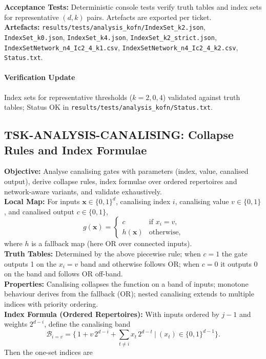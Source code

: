 \documentclass{article}
\begin{document}
\textbf{Acceptance Tests:} Deterministic console tests verify truth tables and index sets for representative \((d,k)\) pairs. Artefacts are exported per ticket.\\
\textbf{Artefacts:} \texttt{results/tests/analysis\_kofn/IndexSet\_k2.json}, \texttt{IndexSet\_k0.json}, \texttt{IndexSet\_k4.json}, \texttt{IndexSet\_k2\_strict.json}, \texttt{IndexSetNetwork\_n4\_Ic2\_4\_k1.csv}, \texttt{IndexSetNetwork\_n4\_Ic2\_4\_k2.csv}, \texttt{Status.txt}.
\paragraph{Verification Update} Index sets for representative thresholds (\(k=2,0,4\)) validated against truth tables; Status OK in \texttt{results/tests/analysis\_kofn/Status.txt}.
\subsection{TSK-ANALYSIS-CANALISING: Collapse Rules and Index Formulae}
\textbf{Objective:} Analyse canalising gates with parameters (index, value, canalised output), derive collapse rules, index formulae over ordered repertoires and network-aware variants, and validate exhaustively.\\
\textbf{Local Map:} For inputs \(\mathbf{x}\in\{0,1\}^d\), canalising index \(i\), canalising value \(v\in\{0,1\}\), and canalised output \(c\in\{0,1\}\),
\[
g(\mathbf{x}) = \begin{cases}
 c & \text{if } x_i = v,\\
 h(\mathbf{x}) & \text{otherwise,}
\end{cases}
\]
where \(h\) is a fallback map (here \(\mathrm{OR}\) over connected inputs).\\
\textbf{Truth Tables:} Determined by the above piecewise rule; when \(c=1\) the gate outputs 1 on the \(x_i=v\) band and otherwise follows \(\mathrm{OR}\); when \(c=0\) it outputs 0 on the band and follows \(\mathrm{OR}\) off-band.\\
\textbf{Properties:} Canalising collapses the function on a band of inputs; monotone behaviour derives from the fallback (\(\mathrm{OR}\)); nested canalising extends to multiple indices with priority ordering.\\
\textbf{Index Formula (Ordered Repertoires):} With inputs ordered by \(j-1\) and weights \(2^{d-i}\), define the canalising band
\[
\mathcal{B}_{i=v} = \Big\{\, 1 + v\,2^{d-i} + \sum_{t\ne i} x_t\,2^{d-t} \ \Big| \ (x_t)\in\{0,1\}^{d-1} \Big\}.
\]
Then the one-set indices are
\end{document}
